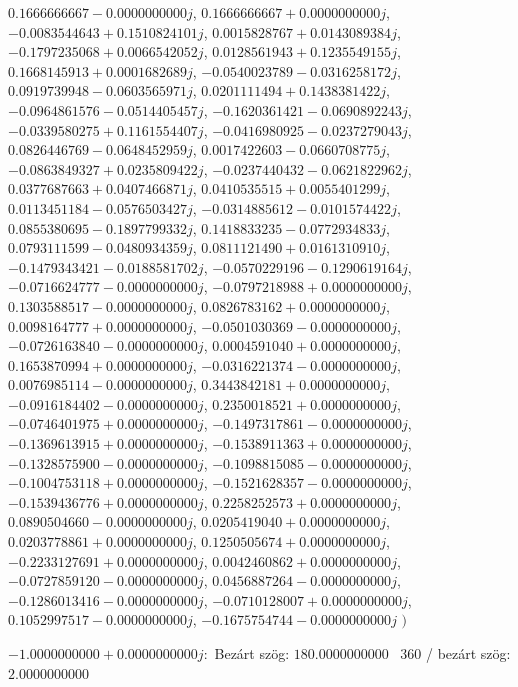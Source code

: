 \documentclass[14pt,a4paper]{article}
\begin{document}
\begin{itemize}
$0.1666666667-0.0000000000j$, $0.1666666667+0.0000000000j$, $-0.0083544643+0.1510824101j$, $0.0015828767+0.0143089384j$, $-0.1797235068+0.0066542052j$, $0.0128561943+0.1235549155j$, $0.1668145913+0.0001682689j$, $-0.0540023789-0.0316258172j$, $0.0919739948-0.0603565971j$, $0.0201111494+0.1438381422j$, $-0.0964861576-0.0514405457j$, $-0.1620361421-0.0690892243j$, $-0.0339580275+0.1161554407j$, $-0.0416980925-0.0237279043j$, $0.0826446769-0.0648452959j$, $0.0017422603-0.0660708775j$, $-0.0863849327+0.0235809422j$, $-0.0237440432-0.0621822962j$, $0.0377687663+0.0407466871j$, $0.0410535515+0.0055401299j$, $0.0113451184-0.0576503427j$, $-0.0314885612-0.0101574422j$, $0.0855380695-0.1897799332j$, $0.1418833235-0.0772934833j$, $0.0793111599-0.0480934359j$, $0.0811121490+0.0161310910j$, $-0.1479343421-0.0188581702j$, $-0.0570229196-0.1290619164j$, $-0.0716624777-0.0000000000j$, $-0.0797218988+0.0000000000j$, $0.1303588517-0.0000000000j$, $0.0826783162+0.0000000000j$, $0.0098164777+0.0000000000j$, $-0.0501030369-0.0000000000j$, $-0.0726163840-0.0000000000j$, $0.0004591040+0.0000000000j$, $0.1653870994+0.0000000000j$, $-0.0316221374-0.0000000000j$, $0.0076985114-0.0000000000j$, $0.3443842181+0.0000000000j$, $-0.0916184402-0.0000000000j$, $0.2350018521+0.0000000000j$, $-0.0746401975+0.0000000000j$, $-0.1497317861-0.0000000000j$, $-0.1369613915+0.0000000000j$, $-0.1538911363+0.0000000000j$, $-0.1328575900-0.0000000000j$, $-0.1098815085-0.0000000000j$, $-0.1004753118+0.0000000000j$, $-0.1521628357-0.0000000000j$, $-0.1539436776+0.0000000000j$, $0.2258252573+0.0000000000j$, $0.0890504660-0.0000000000j$, $0.0205419040+0.0000000000j$, $0.0203778861+0.0000000000j$, $0.1250505674+0.0000000000j$, $-0.2233127691+0.0000000000j$, $0.0042460862+0.0000000000j$, $-0.0727859120-0.0000000000j$, $0.0456887264-0.0000000000j$, $-0.1286013416-0.0000000000j$, $-0.0710128007+0.0000000000j$, $0.1052997517-0.0000000000j$, $-0.1675754744-0.0000000000j$
$\big)$
\end{itemize}
$-1.0000000000+0.0000000000j$:\
Bezárt szög: $180.0000000000$ \
360 / bezárt szög: $2.0000000000$\
\end{document}
